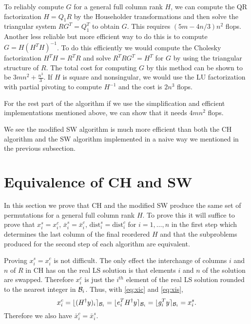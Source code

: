 \documentclass[conference]{IEEEtran}
\newcommand{\be}{\begin{equation}}
\newcommand{\ee}{\end{equation}}
\newcommand{\dist}{\mathrm{dist}}
\begin{document}
To reliably compute $G$ for a general full column rank $H$,
we can compute the  QR factorization $H=Q_1R$ by the Householder transformations
and then solve the triangular system  $RG^T=Q_1^T$ to obtain $G$.
This requires $(5m-4n/3)n^2$ flops. 
Another less reliable but more efficient way to do this is to compute $G=H(H^TH)^{-1}$. 
To do this efficiently we would compute the Cholesky factorization  $H^TH = R^TR$ and solve 
$R^TRG^T = H^T$ for $G$ by using the triangular structure of $R$. 
The total cost for computing $G$ by this method can be shown to be $3mn^2+\frac{n^3}{3}$.
If $H$ is square and nonsingular, we would use the LU factorization with partial pivoting to compute $H^{-1}$
and the cost is $2n^3$ flops.

For the rest part of the algorithm if we use the simplification and efficient implementations
mentioned above, we can show that it needs $4mn^2$ flops. 

We see the modified SW algorithm is much more efficient than both the CH algorithm
and the SW algorithm implemented in a naive way we mentioned in the previous subsection. 



\section{Equivalence of CH and SW}\label{sec:equivalence}
In this section we prove that  CH and  the modified  SW produce the same set of permutations
for a general full column rank $H$.
To prove this it will suffice to prove that $x_i^s = x_i^c$, $\bar{x}_i^s =\bar{x}_i^c$,
$\dist_i^s = \dist_i^c$ for $i=1, \ldots, n$ in the first step which determines the last column of the final reordered $H$
and that the subproblems produced for the second step of
each algorithm are equivalent. 

Proving $x_i^s = x_i^c$ is not difficult.
The only effect the interchange of columns $i$  and $n$ of $R$ in CH  
has on the real LS solution is that elements $i$ and $n$ of the solution are swapped.
Therefore $x_i^c$ is just the $i^{th}$ element of the real LS
solution rounded to the nearest integer in ${{\cal B}_i }$. 
Thus, with \eqref{eq:xic} and \eqref{eq:xis},
\be
x_i^c=   \lfloor (H^{\dagger}y)_i  \rceil_{{\cal B}_i }
=  \lfloor e_i^T H^{\dagger}y   \rceil_{{\cal B}_i }
=  \lfloor g_i^T  y \rceil_{{\cal B}_i } =x_i^s.
\label{eq:xics}
\ee
Therefore we also have $\bar{x}_i^c=\bar{x}_i^s$.
\end{document}
